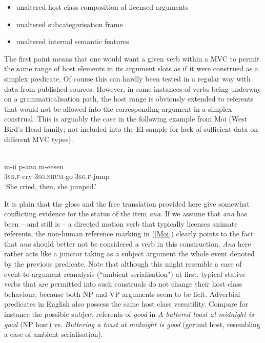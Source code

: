 \begin{itemize}
\item unaltered host class composition of licensed arguments
\item unaltered subcategorisation frame
\item unaltered internal semantic features
\end{itemize}
	
The first point means that one would want a given verb within a MVC to permit the same range of host elements in its argument slots as if it were construed as a simplex predicate. Of course this can hardly been tested in a regular way with data from published sources. However, in some instances of verbs being underway on a grammaticalisation path, the host range is obviously extended to referents that would not be allowed into the corresponding argument in a simplex construal. This is arguably the case in the following example from Moi (West Bird's Head family; not included into the EI sample for lack of sufficient data on different MVC types).

\ea \label{Moi}
\\
\gll m-ii p-ana m-eesen \\
3\textsc{sg}.\textsc{f}-cry 3\textsc{sg}.\textsc{nhum}-go 3\textsc{sg}.\textsc{f}-jump \\
\glft `She cried, then, she jumped.’\\ 
\z

It is plain that the gloss and the free translation provided here give somewhat conflicting evidence for the status of the item \textit{ana}. If we assume that \textit{ana} has been -- and still is -- a directed motion verb that typically licenses animate referents, the non-human reference marking in (\ref{Moi}) clearly points to the fact that \textit{ana} should better not be considered a verb in this construction. \textit{Ana} here rather acts like a junctor taking as a subject argument the whole event denoted by the previous predicate. Note that although this might resemble a case of event-to-argument reanalysis (``ambient serialisation") at first, typical stative verbs that are permitted into such construals do not change their host class behaviour, because both NP and VP arguments seem to be licit. Adverbial predicates in English also possess the same host class versatility. Compare for instance the possible subject referents of \textit{good} in \textit{A buttered toast at midnight is good} (NP host) vs. \textit{Buttering a toast at midnight is good} (gerund host, resembling a case of ambient serialisation).

